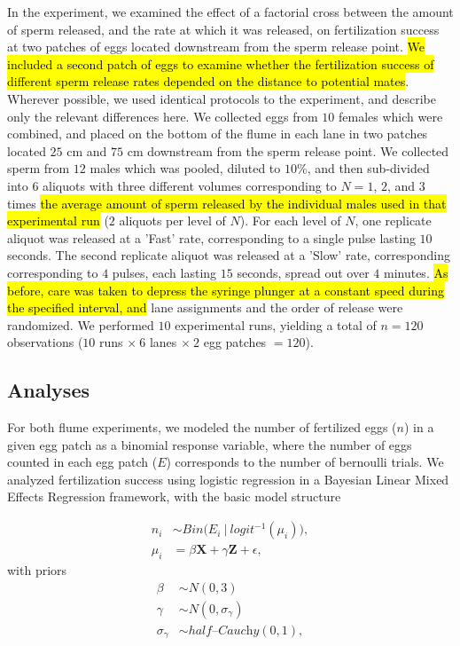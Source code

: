 \documentclass{article}
\begin{document}
	In the  experiment, we examined the effect of a factorial cross between the amount of sperm released, and the rate at which it was released, on fertilization success at two patches of eggs located downstream from the sperm release point. \hl{We included a second patch of eggs to examine whether the fertilization success of different sperm release rates depended on the distance to potential mates}. Wherever possible, we used identical protocols to the  experiment, and describe only the relevant differences here. We collected eggs from $10$ females which were combined, and placed on the bottom of the flume in each lane in two patches located $25$ cm and $75$ cm downstream from the sperm release point. We collected sperm from $12$ males which was pooled, diluted to $10$\%, and then sub-divided into $6$ aliquots with three different volumes corresponding to $N = 1$, $2$, and $3$ times \hl{the average amount of sperm released by the individual males used in that experimental run} ($2$ aliquots per level of $N$). For each level of $N$, one replicate aliquot was released at a 'Fast' rate, corresponding to a single pulse lasting $10$ seconds. The second replicate aliquot was released at a 'Slow' rate, corresponding corresponding to $4$ pulses, each lasting $15$ seconds, spread out over $4$ minutes. \hl{As before, care was taken to depress the syringe plunger at a constant speed during the specified interval, and} lane assignments and the order of release were randomized. We performed $10$ experimental runs, yielding a total of $n=120$ observations ($10$ runs $\times~6$ lanes $\times~2$ egg patches $= 120$).

	\subsection*{Analyses}
	For both flume experiments, we modeled the number of fertilized eggs ($n$) in a given egg patch as a binomial response variable, where the number of eggs counted in each egg patch ($E$) corresponds to the number of bernoulli trials. We analyzed fertilization success using logistic regression in a Bayesian Linear Mixed Effects Regression framework, with the basic model structure 

\begin{align*}
	n_i   &\sim Bin\Big(E_i~|~logit^{-1}(\mu_i)\Big), \\
	\mu_i &= \beta \mathbf{X} + \gamma \mathbf{Z} + \epsilon,
\end{align*}
\noindent{} with priors
\begin{align*}
	\beta           &\sim N(0,3) \\
	\gamma          &\sim N(0,\sigma_{\gamma}) \\
	\sigma_{\gamma} &\sim \mathit{half} \text{--}\textit{Cauchy}(0,1),
\end{align*}
\end{document}
